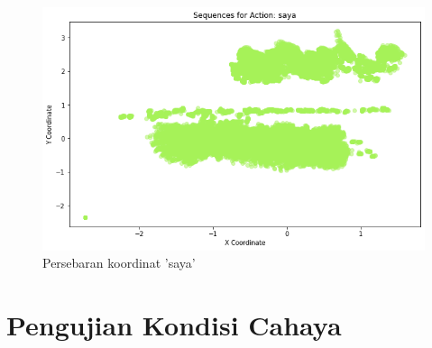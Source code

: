 \begin{figure}[H]
  \centering

  \includegraphics[scale=0.7]{gambar/coor-saya.png}

  \caption{Persebaran koordinat 'saya'}
  \label{fig:isyarat-coor-saya}
\end{figure}

\newpage
\section{Pengujian Kondisi Cahaya}
\label{sec:analisiscahaya}

